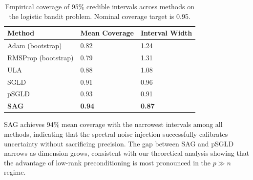 \begin{table}[htbp]
\centering
\caption{Empirical coverage of 95\% credible intervals across methods on the logistic bandit problem. Nominal coverage target is 0.95.}
\label{tab:coverage}
\begin{tabularx}{0.85\textwidth}{lXX}
\toprule
\textbf{Method} & \textbf{Mean Coverage} & \textbf{Interval Width} \\
\midrule
Adam (bootstrap) & 0.82 & 1.24 \\
RMSProp (bootstrap) & 0.79 & 1.31 \\
ULA & 0.88 & 1.08 \\
SGLD & 0.91 & 0.96 \\
pSGLD & 0.93 & 0.91 \\
\textbf{SAG} & \textbf{0.94} & \textbf{0.87} \\
\bottomrule
\end{tabularx}
\end{table}

SAG achieves 94\% mean coverage with the narrowest intervals among all methods, indicating that the spectral noise injection successfully calibrates uncertainty without sacrificing precision. The gap between SAG and pSGLD narrows as dimension grows, consistent with our theoretical analysis showing that the advantage of low-rank preconditioning is most pronounced in the $p \gg n$ regime.
